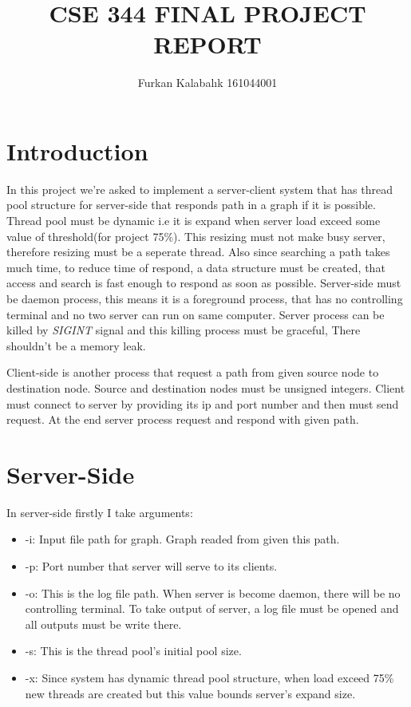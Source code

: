\documentclass[letterpaper, 10 pt, conference]{ieeeconf}  %
\title{\LARGE \bf CSE 344 FINAL PROJECT REPORT}
\author{Furkan Kalabalık 161044001}
\begin{document}
\maketitle
\thispagestyle{empty}
\pagestyle{empty}




\section{Introduction}
In this project we're asked to implement a server-client system that has thread pool structure for server-side that responds path in a graph if it is possible. Thread pool must be dynamic i.e it is expand when server load exceed some value of threshold(for project 75\%). This resizing must not make busy server, therefore resizing must be a seperate thread. Also since searching a path takes much time, to reduce time of respond, a data structure must be created, that access and search is fast enough to respond as soon as possible. Server-side must be daemon process, this means it is a foreground process, that has no controlling terminal and no two server can run on same computer. Server process can be killed by \textit{SIGINT} signal and this killing process must be graceful, There shouldn't be a memory leak. 

Client-side is another process that request a path from given source node to destination node. Source and destination nodes must be unsigned integers. Client must connect to server by providing its ip and port number and then must send request. At the end server process request and respond with given path.

\section{Server-Side}

In server-side firstly I take arguments:
\begin{itemize}
    \item -i: Input file path for graph. Graph readed from given this path.
    \item -p: Port number that server will serve to its clients.
    \item -o: This is the log file path. When server is become daemon, there will be no controlling terminal. To take output of server, a log file must be opened and all outputs must be write there.
    \item -s: This is the thread pool's initial pool size.
    \item -x: Since system has dynamic thread pool structure, when load exceed 75\% new threads are created but this value bounds server's expand size.
\end{itemize}
\end{document}
